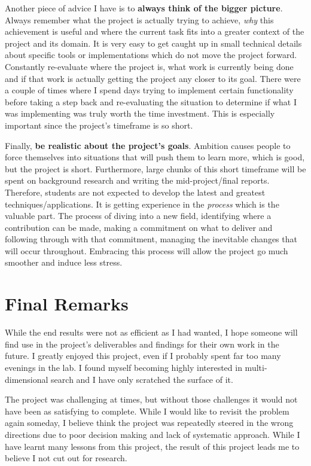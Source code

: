 Another piece of advice I have is to \textbf{always think of the bigger picture}. Always remember what the project is actually trying to achieve, \textit{why} this achievement is useful and where the current task fits into a greater context of the project and its domain. It is very easy to get caught up in small technical details about specific tools or implementations which do not move the project forward. Constantly re-evaluate where the project is, what work is currently being done and if that work is actually getting the project any closer to its goal. There were a couple of times where I spend days trying to implement certain functionality before taking a step back and re-evaluating the situation to determine if what I was implementing was truly worth the time investment. This is especially important since the project's timeframe is so short.

Finally, \textbf{be realistic about the project's goals}. Ambition causes people to force themselves into situations that will push them to learn more, which is good, but the project is short. Furthermore, large chunks of this short timeframe will be spent on background research and writing the mid-project/final reports. Therefore, students are not expected to develop the latest and greatest techniques/applications. It is getting experience in the \textit{process} which is the valuable part. The process of diving into a new field, identifying where a contribution can be made, making a commitment on what to deliver and following through with that commitment, managing the inevitable changes that will occur throughout. Embracing this process will allow the project go much smoother and induce less stress.

\section{Final Remarks}

While the end results were not as efficient as I had wanted, I hope someone will find use in the project's deliverables and findings for their own work in the future. I greatly enjoyed this project, even if I probably spent far too many evenings in the lab. I found myself becoming highly interested in multi-dimensional search and I have only scratched the surface of it. 

The project was challenging at times, but without those challenges it would not have been as satisfying to complete. While I would like to revisit the problem again someday, I believe think the project was repeatedly steered in the wrong directions due to poor decision making and lack of systematic approach. While I have learnt many lessons from this project, the result of this project leads me to believe I not cut out for research.